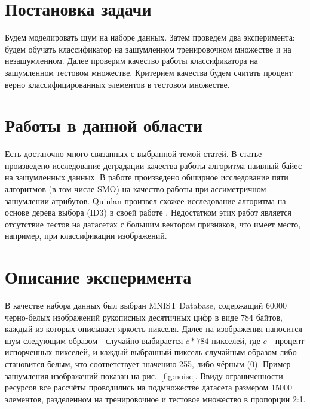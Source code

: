 \documentclass{article}
\begin{document}
\section{Постановка задачи}
Будем моделировать шум на наборе данных. Затем проведем два эксперимента: будем обучать классификатор на зашумленном тренировочном множестве и на незашумленном. Далее проверим качество работы классификатора на зашумленном тестовом множестве. Критерием качества будем считать процент верно классифицированных элементов в тестовом множестве. 


 
\section{Работы в данной области}
Есть достаточно много связанных с выбранной темой статей. В статье \cite{glick2004enrichment} произведено исследование деградации качества работы алгоритма наивный байес на зашумленных данных. В работе \cite{Mannino2009743} произведено обширное исследование пяти алгоритмов (в том числе SMO) на качество работы при ассиметричном зашумлении атрибутов. Quinlan произвел схожее исследование алгоритма на основе дерева выбора (ID3) в своей работе \cite{QuinlanTrees}. Недостатком этих работ является отсутствие тестов на датасетах с большим вектором признаков, что имеет место, например, при классификации изображений.

\section{Описание эксперимента}
В качестве набора данных был выбран MNIST Database\cite{quanpt:mnistlecun}, содержащий 60000 черно-белых изображений рукописных десятичных цифр в виде 784 байтов, каждый из которых описывает яркость пикселя. Далее на изображения наносится шум следующим образом - случайно выбирается $c * 784$ пикселей, где $c$ - процент испорченных пикселей, и каждый выбранный пиксель случайным образом либо становится белым, что соответствует значению 255, либо чёрным (0). Пример зашумления изображений показан на рис.~\ref{fig:noise}. Ввиду ограниченности ресурсов все рассчёты проводились на подмножестве датасета размером 15000 элементов, разделенном на тренировочное и тестовое множество в пропорции 2:1.
\end{document}
